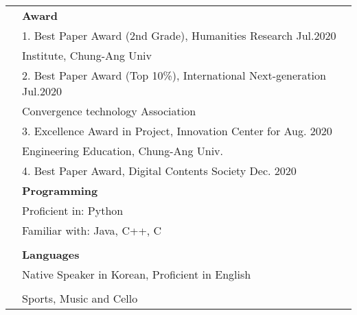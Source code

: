 \documentclass[letterpaper, 11pt]{article}
\begin{document}
\begin{longtable}{p{1.3in}p{4.8in}}
& \textbf{Award} \\
& \setlength{\leftskip}{10pt} 1. Best Paper Award (2nd Grade), Humanities Research \hfill Jul.2020 \\
& \setlength{\leftskip}{20pt} Institute, Chung-Ang Univ  \\
& \setlength{\leftskip}{10pt} 2. Best Paper Award (Top 10\%), International Next-generation \hfill Jul.2020 \\
& \setlength{\leftskip}{20pt} Convergence technology Association  \\
& \setlength{\leftskip}{10pt} 3. Excellence Award in Project, Innovation Center for \hfill Aug. 2020 \\
& \setlength{\leftskip}{20pt} Engineering Education, Chung-Ang Univ.  \\
& \setlength{\leftskip}{10pt} 4. Best Paper Award, Digital Contents Society \hfill Dec. 2020

\\

{\color{OliveGreen}{Skills}} 
& \textbf{Programming}\\
& Proficient in: Python \\
& Familiar with: Java, C++, C \\
& \\

& \textbf{Languages} \\
& Native Speaker in Korean, Proficient in English \\
& \\




\nohyphens{\color{OliveGreen}{Other interests}} & Sports, Music and Cello\\


\end{longtable}
\end{document}

